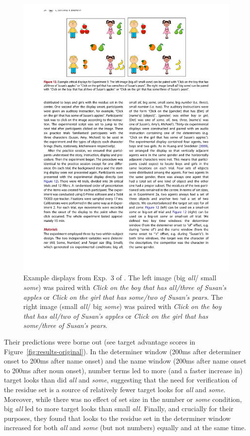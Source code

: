 \documentclass[10pt,letterpaper]{article}
\newcommand{\figref}[1]{Figure~\ref{#1}}
\newcommand{\expref}[1]{Exp.~#1}
\begin{document}
\begin{figure}[H]
\centering
\includegraphics[width=\columnwidth]{images/display}
\caption{Example displays from \expref{3} of . The left image (big \emph{all}/ small  \emph{some}) was paired with  \emph{Click on the boy that has all/three of Susan's apples} or  \emph{Click on the girl that has some/two of Susan's pears}. The right image (small  \emph{all}/ big  \emph{some}) was paired with  \emph{Click on the boy that has all/two of Susan's apples} or  \emph{Click on the girl that has some/three of Susan's pears}.} 
\label{fig:display}
\end{figure}

Their predictions were borne out (see target advantage scores in  \figref{fig:results-original}). In the determiner window (200ms after determiner onset to 200ms after name onset) and the name window (200ms after name onset to 200ms after noun onset), number terms led to more (and a faster increase in) target looks than did \emph{all} and \emph{some}, suggesting that the need for verification of the residue set is a source of relatively fewer target looks for \emph{all} and \emph{some}. Moreover, while there was no effect of set size in the number or \emph{some} condition, big \emph{all} led to more target looks than small \emph{all}. Finally, and crucially for their purposes, they found that looks to the residue set in the determiner window increased for both \emph{all} and \emph{some} (but not numbers) equally and at the same time. 
\end{document}
